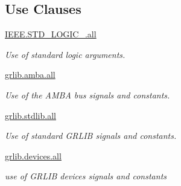 \subsection*{Use Clauses}
 \begin{DoxyCompactItemize}
\item 
\hypertarget{classdummyapb_a68c233289eaf7d2601307bdd93b4c299}{\hyperlink{classdummyapb_a68c233289eaf7d2601307bdd93b4c299}{I\-E\-E\-E.\-S\-T\-D\-\_\-\-L\-O\-G\-I\-C\-\_.\-all}   }\label{classdummyapb_a68c233289eaf7d2601307bdd93b4c299}

\begin{DoxyCompactList}\small\item\em Use of standard logic arguments. \end{DoxyCompactList}\item 
\hypertarget{classdummyapb_a543ad46b77c6dc7048df8e72163d311d}{\hyperlink{classdummyapb_a543ad46b77c6dc7048df8e72163d311d}{grlib.\-amba.\-all}   }\label{classdummyapb_a543ad46b77c6dc7048df8e72163d311d}

\begin{DoxyCompactList}\small\item\em Use of the A\-M\-B\-A bus signals and constants. \end{DoxyCompactList}\item 
\hypertarget{classdummyapb_a8290b68c465332cd784781f7230e772d}{\hyperlink{classdummyapb_a8290b68c465332cd784781f7230e772d}{grlib.\-stdlib.\-all}   }\label{classdummyapb_a8290b68c465332cd784781f7230e772d}

\begin{DoxyCompactList}\small\item\em Use of standard G\-R\-L\-I\-B signals and constants. \end{DoxyCompactList}\item 
\hypertarget{classdummyapb_ad24672e694b1bed181a8b2813b132538}{\hyperlink{classdummyapb_ad24672e694b1bed181a8b2813b132538}{grlib.\-devices.\-all}   }\label{classdummyapb_ad24672e694b1bed181a8b2813b132538}

\begin{DoxyCompactList}\small\item\em use of G\-R\-L\-I\-B devices signals and constants \end{DoxyCompactList}\end{DoxyCompactItemize}

